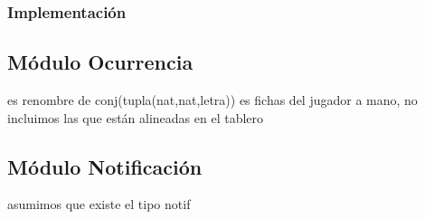 \subsubsection{Implementación}

\subsection{Módulo Ocurrencia}
es renombre de conj(tupla(nat,nat,letra)) es fichas del jugador a mano, no incluimos las que están alineadas en el tablero

\subsection{Módulo Notificación}
asumimos que existe el tipo notif

